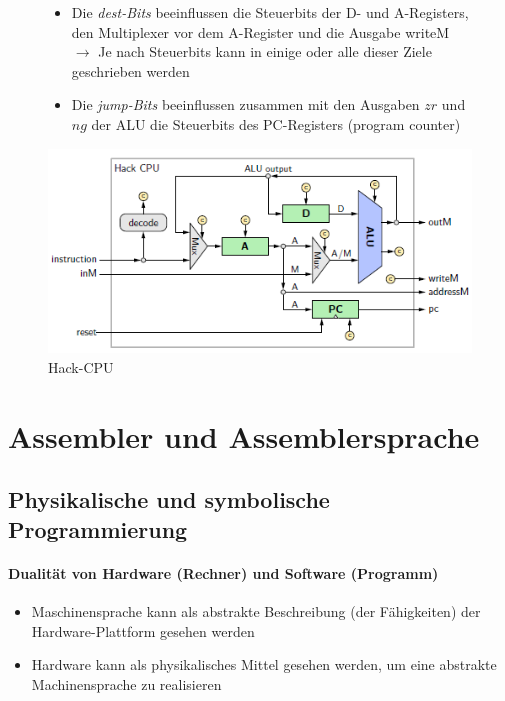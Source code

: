 \documentclass[12pt]{report}
\begin{document}
\begin{figure}[H]
  \begin{minipage}[t]{0.45\textwidth}
    \begin{itemize}
      \item Die \textit{dest-Bits} beeinflussen die Steuerbits der D- und A-Registers, den Multiplexer vor dem A-Register und die Ausgabe writeM
            \subitem $\rightarrow$ Je nach Steuerbits kann in einige oder alle dieser Ziele geschrieben werden 
      \item Die \textit{jump-Bits} beeinflussen zusammen mit den Ausgaben $zr$ und $ng$ der ALU die Steuerbits des PC-Registers (program counter)
    \end{itemize}
  \end{minipage}
  \hfill
  \begin{minipage}[t]{0.45\textwidth}
    \caption{Hack-CPU}
    \label{fig:hack_cpu_leitungen}
    \centering
    \includegraphics[width=\textwidth]{hack_cpu_leitungen}
  \end{minipage}
\end{figure}


\section{Assembler und Assemblersprache}
\subsection{Physikalische und symbolische Programmierung}
\paragraph{Dualität von Hardware (Rechner) und Software (Programm)}
\begin{itemize}
  \item Maschinensprache kann als abstrakte Beschreibung (der Fähigkeiten) der Hardware-Plattform gesehen werden
  \item Hardware kann als physikalisches Mittel gesehen werden, um eine abstrakte Machinensprache zu realisieren
\end{itemize}
\end{document}
